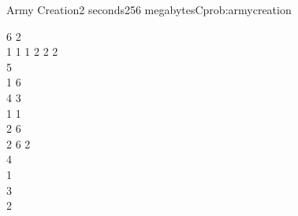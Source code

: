 \begin{programmingproblem}{Army Creation}{2 seconds}{256 megabytes}{C}{prob:armycreation}
    \begin{problemexamples}
        \begin{example}{
            6 2\\
            1 1 1 2 2 2\\
            5\\
            1 6\\
            4 3\\
            1 1\\
            2 6\\
            2 6
        }{
            2\\
            4\\
            1\\
            3\\
            2
        }
        \end{example}
    \end{problemexamples}
    
\end{programmingproblem}
